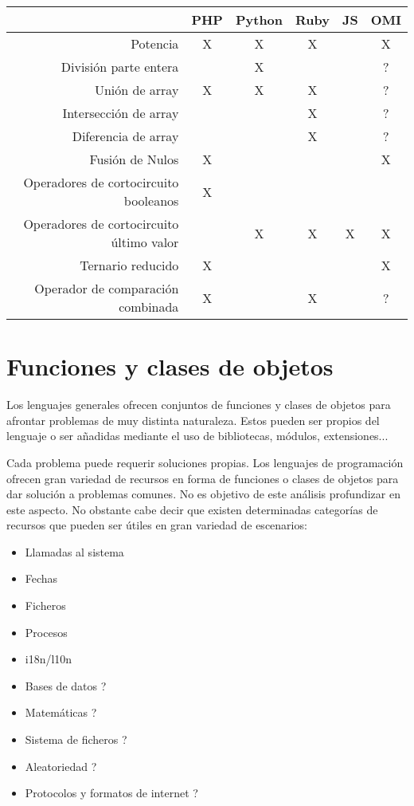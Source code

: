 \FloatBarrier
\begin{table}[h]
\begin{center}
 
\begin{tabular}{|r|c|c|c|c|c|} \hline
 & PHP  & Python & Ruby & JS & OMI\\ \hline
Potencia & X & X & X  &  & X \\ \hline
División parte entera &  & X &   &  & ? \\ \hline
Unión de array & X & X & X  &  & ? \\ \hline
Intersección de array &  &  & X  &  & ? \\ \hline
Diferencia de array &  &  & X  &  & ? \\ \hline
Fusión de Nulos  & X &  &   &  & X \\ \hline
Operadores de cortocircuito booleanos  & X &  &   &  &  \\ \hline
Operadores de cortocircuito último valor  & & X & X  & X & X \\ \hline
Ternario reducido  & X &  &   &  & X \\ \hline
Operador de comparación combinada & X &  & X  &  & ? \\ \hline
\end{tabular}
\end{center}
\end{table}
\FloatBarrier



\section{Funciones y clases de objetos}
Los lenguajes generales ofrecen conjuntos de funciones y clases de objetos para afrontar problemas de muy distinta naturaleza. Estos pueden 
ser propios del lenguaje o ser añadidas mediante el uso de bibliotecas, módulos, extensiones... 

Cada problema puede requerir soluciones propias. Los lenguajes de programación ofrecen gran variedad de recursos en
forma de funciones o clases de objetos para dar solución a problemas comunes. No es objetivo de este análisis profundizar en este aspecto. 
No obstante cabe decir que existen determinadas categorías de recursos que pueden ser útiles en gran variedad de escenarios:

\begin{itemize}
   \item Llamadas al sistema
   \item Fechas
   \item Ficheros
   \item Procesos
   \item i18n/l10n
   \item Bases de datos ?
   \item Matemáticas ?
   \item Sistema de ficheros ?
   \item Aleatoriedad ?
   \item Protocolos y formatos de internet ?
\end{itemize}

